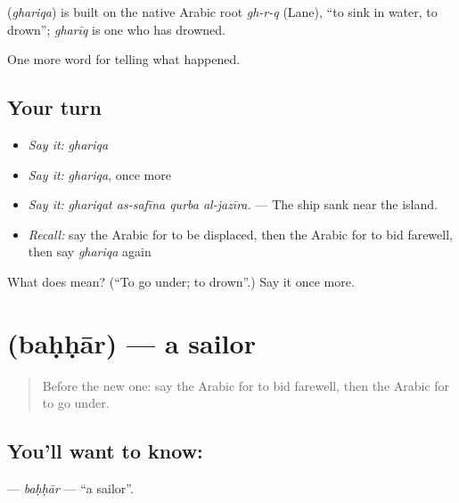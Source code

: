 \begin{cousinweb}
\textbf{} (\emph{ghariqa}) is built on the native Arabic root \emph{gh-r-q} (Lane), \textquotedblleft{}to sink in water, to drown\textquotedblright{}; \emph{gharīq} is one who has drowned.
\end{cousinweb}

\begin{grammarlens}[title={What you've built}]
One more word for telling what happened.
\end{grammarlens}

\subsection*{Your turn}
\begin{itemize}
\raggedright
  \item \emph{Say it:} \emph{ghariqa}
  \item \emph{Say it:} \emph{ghariqa}, once more
  \item \emph{Say it:} \emph{ghariqat as-safīna qurba al-jazīra.} — The ship sank near the island.
  \item \emph{Recall:} say the Arabic for to be displaced, then the Arabic for to bid farewell, then say \emph{ghariqa} again
\end{itemize}

\begin{tcolorbox}[breakable,colback=teal!4,colframe=teal!35!black,title={Before you move on}]
What does  mean? (\textquotedblleft{}To go under; to drown\textquotedblright{}.) Say it once more.
\end{tcolorbox}
\section[\texorpdfstring{\ar{بحار} (baḥḥār)}{بحار (baḥḥār)}]{ (baḥḥār) — a sailor}

\label{lesson:AR-C333-bahhar}



\begin{quote}
Before the new one: say the Arabic for to bid farewell, then the Arabic for to go under.
\end{quote}

\subsection*{You'll want to know: }
\textbf{} — \emph{baḥḥār} — \textquotedblleft{}a sailor\textquotedblright{}.

